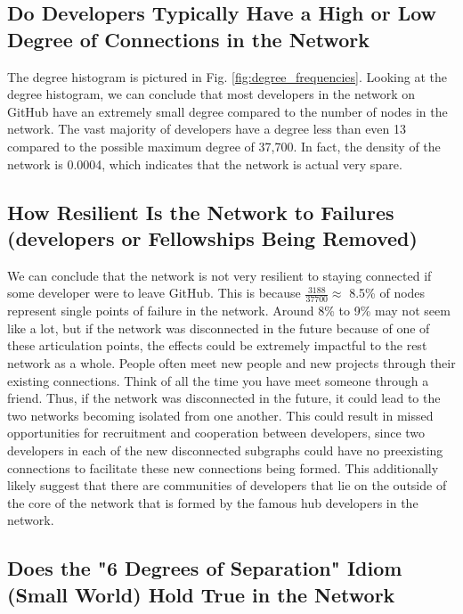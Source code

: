\documentclass[9pt,twocolumn,twoside]{pnas-new}
\begin{document}
\subsection{Do Developers Typically Have a High or Low Degree of Connections in the Network}

The degree histogram is pictured in Fig. \ref{fig:degree_frequencies}. Looking at the degree histogram, we can conclude that most developers in the network on GitHub have an extremely small degree compared to the number of nodes in the network. The vast majority of developers have a degree less than even 13 compared to the possible maximum degree of 37,700. In fact, the density of the network is 0.0004, which indicates that the network is actual very spare.

\subsection{How Resilient Is the Network to Failures (developers or Fellowships Being Removed)}

We can conclude that the network is not very resilient to staying connected if some developer were to leave GitHub. This is because $\frac{3188}{37700} \approx$ 8.5\% of nodes represent single points of failure in the network. Around 8\% to 9\% may not seem like a lot, but if the network was disconnected in the future because of one of these articulation points, the effects could be extremely impactful to the rest network as a whole. People often meet new people and new projects through their existing connections. Think of all the time you have meet someone through a friend. Thus, if the network was disconnected in the future, it could lead to the two networks becoming isolated from one another. This could result in missed opportunities for recruitment and cooperation between developers, since two developers in each of the new disconnected subgraphs could have no preexisting connections to facilitate these new connections being formed. This additionally likely suggest that there are communities of developers that lie on the outside of the core of the network that is formed by the famous hub developers in the network.

\subsection{Does the "6 Degrees of Separation" Idiom (Small World) Hold True in the Network}
\end{document}
